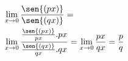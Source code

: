 \begin{ex}
\begin{align}
&\lim_{x\rightarrow 0} \frac{\sen{(px)}}{\sen{(qx)}}=\nonumber\\
&\lim_{x\rightarrow 0} \frac{\frac{\sen{(px)}}{px}.px}{\frac{\sen{(qx)}}{qx}.qx}=\lim_{x\rightarrow 0} \frac{px}{qx}=\frac{p}{q}\nonumber
\end{align}
\end{ex}
